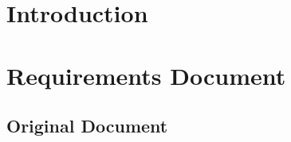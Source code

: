\documentclass[onecolumn, draftclsnofoot,10pt, compsoc]{IEEEtran}
\begin{document}




\section{Introduction}






\pagebreak
\section{Requirements Document}

\subsection{Original Document}
\end{document}

